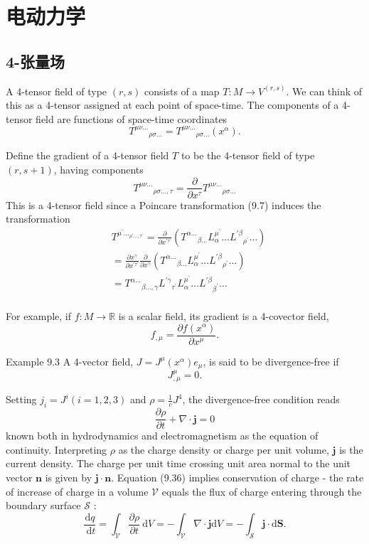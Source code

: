 \documentclass[hyperref,UTF8]{ctexbook}
\begin{document}
\section{电动力学}
\subsection{4-张量场}
A 4-tensor field of type $(r, s)$ consists of a map $T: M \rightarrow V^{(r, s)}$. We can think of this as a 4-tensor assigned at each point of space-time. The components of a 4-tensor field are functions of space-time coordinates
$$
T^{\mu \nu \ldots}{ }_{\rho \sigma \ldots}=T^{\mu \nu \ldots}{ }_{\rho \sigma \ldots}\left(x^\alpha\right) .
$$

Define the gradient of a 4-tensor field $T$ to be the 4-tensor field of type $(r, s+1)$, having components
$$
T^{\mu \nu \ldots}{ }_{\rho \sigma \ldots, \tau}=\frac{\partial}{\partial x^\tau} T^{\mu \nu \ldots}{ }_{\rho \sigma \ldots}
$$
This is a 4-tensor field since a Poincare transformation (9.7) induces the transformation
$$
\begin{aligned}
& T^{\mu^{\prime} \ldots{ }_{\rho^{\prime} \ldots, \tau^{\prime}}}=\frac{\partial}{\partial x^{\prime \tau^{\prime}}}\left(T^{\alpha \ldots}{ }_{\beta \ldots} L_\alpha^{\mu^{\prime}} \ldots L^{\prime \beta}{ }_{\rho^{\prime}} \ldots\right) \\
& =\frac{\partial x^\gamma}{\partial x^{\prime \tau^{\prime}}} \frac{\partial}{\partial x^\gamma}\left(T^{\alpha \ldots}{ }_{\beta \ldots} L_\alpha^{\mu^{\prime}} \ldots L^{\prime \beta}{ }_{\rho^{\prime}} \ldots\right) \\
& =T^{\alpha \ldots}{ }_{\beta \ldots, \gamma} L^{\prime \gamma}{ }_{\tau^{\prime}} L_\alpha^{\mu^{\prime}} \ldots L^{\prime \beta}{ }_{\beta^{\prime}} \ldots \\
&
\end{aligned}
$$

For example, if $f: M \rightarrow \mathbb{R}$ is a scalar field, its gradient is a 4-covector field,
$$
f_{, \mu}=\frac{\partial f\left(x^\alpha\right)}{\partial x^\mu} .
$$

Example 9.3 A 4-vector field, $J=J^\mu\left(x^\alpha\right) e_\mu$, is said to be divergence-free if
$$
J_{, \mu}^\mu=0 .
$$

Setting $j_i=J^i(i=1,2,3)$ and $\rho=\frac{1}{c} J^4$, the divergence-free condition reads
$$
\frac{\partial \rho}{\partial t}+\nabla \cdot \mathbf{j}=0
$$
known both in hydrodynamics and electromagnetism as the equation of continuity. Interpreting $\rho$ as the charge density or charge per unit volume, $\mathbf{j}$ is the current density. The charge per unit time crossing unit area normal to the unit vector $\mathbf{n}$ is given by $\mathbf{j} \cdot \mathbf{n}$. Equation (9.36) implies conservation of charge - the rate of increase of charge in a volume $\mathcal{V}$ equals the flux of charge entering through the boundary surface $\mathcal{S}$ :
$$
\frac{\mathrm{d} q}{\mathrm{~d} t}=\int_{\mathcal{V}} \frac{\partial \rho}{\partial t} \mathrm{~d} V=-\int_{\mathcal{V}} \nabla \cdot \mathbf{j} \mathrm{d} V=-\int_{\mathcal{S}} \mathbf{j} \cdot \mathrm{d} \mathbf{S} .
$$
\end{document}
